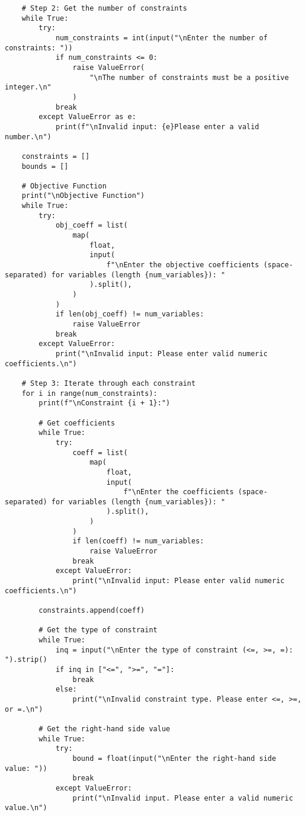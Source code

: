 \documentclass[letterpaper, a4paper]{article}
\begin{document}
\begin{verbatim}
    # Step 2: Get the number of constraints
    while True:
        try:
            num_constraints = int(input("\nEnter the number of constraints: "))
            if num_constraints <= 0:
                raise ValueError(
                    "\nThe number of constraints must be a positive integer.\n"
                )
            break
        except ValueError as e:
            print(f"\nInvalid input: {e}Please enter a valid number.\n")

    constraints = []
    bounds = []

    # Objective Function
    print("\nObjective Function")
    while True:
        try:
            obj_coeff = list(
                map(
                    float,
                    input(
                        f"\nEnter the objective coefficients (space-separated) for variables (length {num_variables}): "
                    ).split(),
                )
            )
            if len(obj_coeff) != num_variables:
                raise ValueError
            break
        except ValueError:
            print("\nInvalid input: Please enter valid numeric coefficients.\n")

    # Step 3: Iterate through each constraint
    for i in range(num_constraints):
        print(f"\nConstraint {i + 1}:")

        # Get coefficients
        while True:
            try:
                coeff = list(
                    map(
                        float,
                        input(
                            f"\nEnter the coefficients (space-separated) for variables (length {num_variables}): "
                        ).split(),
                    )
                )
                if len(coeff) != num_variables:
                    raise ValueError
                break
            except ValueError:
                print("\nInvalid input: Please enter valid numeric coefficients.\n")

        constraints.append(coeff)

        # Get the type of constraint
        while True:
            inq = input("\nEnter the type of constraint (<=, >=, =): ").strip()
            if inq in ["<=", ">=", "="]:
                break
            else:
                print("\nInvalid constraint type. Please enter <=, >=, or =.\n")

        # Get the right-hand side value
        while True:
            try:
                bound = float(input("\nEnter the right-hand side value: "))
                break
            except ValueError:
                print("\nInvalid input. Please enter a valid numeric value.\n")


\end{verbatim}
\end{document}
